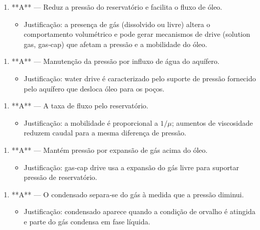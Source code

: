 \documentclass[11pt,a4paper]{article}
\begin{document}
\begin{enumerate}
\item **A** — Reduz a pressão do reservatório e facilita o fluxo de óleo.
\begin{itemize}
\item Justificação: a presença de gás (dissolvido ou livre) altera o comportamento volumétrico e pode gerar mecanismos de drive (solution gas, gas‑cap) que afetam a pressão e a mobilidade do óleo.
\end{itemize}
\end{enumerate}

\begin{enumerate}
\item **A** — Manutenção da pressão por influxo de água do aquífero.
\begin{itemize}
\item Justificação: water drive é caracterizado pelo suporte de pressão fornecido pelo aquífero que desloca óleo para os poços.
\end{itemize}
\end{enumerate}

\begin{enumerate}
\item **A** — A taxa de fluxo pelo reservatório.
\begin{itemize}
\item Justificação: a mobilidade é proporcional a $1/\mu$; aumentos de viscosidade reduzem caudal para a mesma diferença de pressão.
\end{itemize}
\end{enumerate}

\begin{enumerate}
\item **A** — Mantém pressão por expansão de gás acima do óleo.
\begin{itemize}
\item Justificação: gas‑cap drive usa a expansão do gás livre para suportar pressão de reservatório.
\end{itemize}
\end{enumerate}

\begin{enumerate}
\item **A** — O condensado separa‑se do gás à medida que a pressão diminui.
\begin{itemize}
\item Justificação: condensado aparece quando a condição de orvalho é atingida e parte do gás condensa em fase líquida.
\end{itemize}
\end{enumerate}
\end{document}

